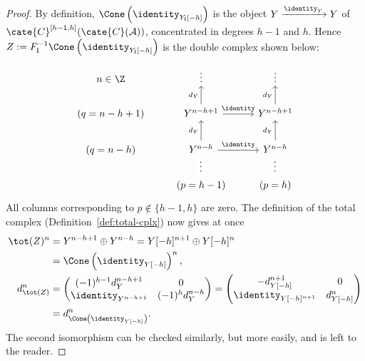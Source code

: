 \begin{proof}
	By definition,
	$\Cone\left(\identity_{Y_{\mathrm{I}}[-h]}\right)$ is the object
	$Y\xrightarrow{\identity_Y}Y$ of
	$\cate{C}^{[h-1,h]}(\cate{C}(\mathcal{A}))$, concentrated in degrees
	$h-1$ and $h$. Hence
	$Z:=F_{\mathrm{I}}^{-1}\Cone\left(\identity_{Y_{\mathrm{I}}[-h]}\right)$
	is the double complex shown below:
	\[\begin{tikzcd}
		n \in \Z & \vdots & \vdots \\
		(q = n-h+1) & Y^{n-h+1} \arrow[u, "d_Y"] \arrow[r, "\identity"] & Y^{n-h+1} \arrow[u, "d_Y"] \\
		(q = n-h) & Y^{n-h} \arrow[r, "\identity"] \arrow[u, "d_Y"] & Y^{n-h} \arrow[u, "d_Y"] \\
		& (p = h-1) \arrow[phantom, u, "\cdots" description, sloped] & (p = h) \arrow[phantom, u, "\cdots" description, sloped]
	\end{tikzcd}\]
	All columns corresponding to $p\notin\{h-1,h\}$ are zero. The definition
	of the total complex (Definition~\ref{def:total-cplx}) now gives at once
	\begin{align*}
		\tot(Z)^n & = Y^{n-h+1} \oplus Y^{n-h} = Y[-h]^{n+1} \oplus Y[-h]^n \\
		& = \Cone\left( \identity_{Y[-h]} \right)^n , \\
		d_{\tot(Z)}^n & = \begin{pmatrix}
			(-1)^{h-1} d_Y^{n-h+1} & 0 \\
			\identity_{Y^{n-h+1}} & (-1)^{h} d_Y^{n-h}
		\end{pmatrix}
		= \begin{pmatrix}
			- d_{Y[-h]}^{n+1} & 0 \\
			\identity_{Y[-h]^{n+1}} & d_{Y[-h]}^n
		\end{pmatrix} \\
		& = d_{\Cone\left( \identity_{Y[-h]} \right)}^n .
	\end{align*}
	The second isomorphism can be checked similarly, but more easily, and is
	left to the reader.
\end{proof}

